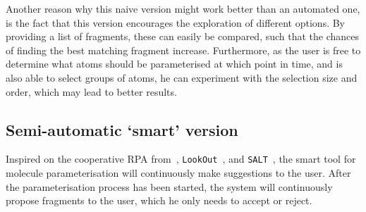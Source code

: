 Another reason why this naive version might work better than an automated one, is the fact that this version encourages the exploration of different options. By providing a list of fragments, these can easily be compared, such that the chances of finding the best matching fragment increase. Furthermore, as the user is free to determine what atoms should be parameterised at which point in time, and is also able to select groups of atoms, he can experiment with the selection size and order, which may lead to better results.


\subsection{Semi-automatic `smart' version}
Inspired on the cooperative RPA from~\cite{payne2000varying}, \verb|LookOut|~\cite{horvitz1999principles}, and \verb|SALT|~\cite{marcus1987taking}, the smart tool for molecule parameterisation will continuously make suggestions to the user. After the parameterisation process has been started, the system will continuously propose fragments to the user, which he only needs to accept or reject.

